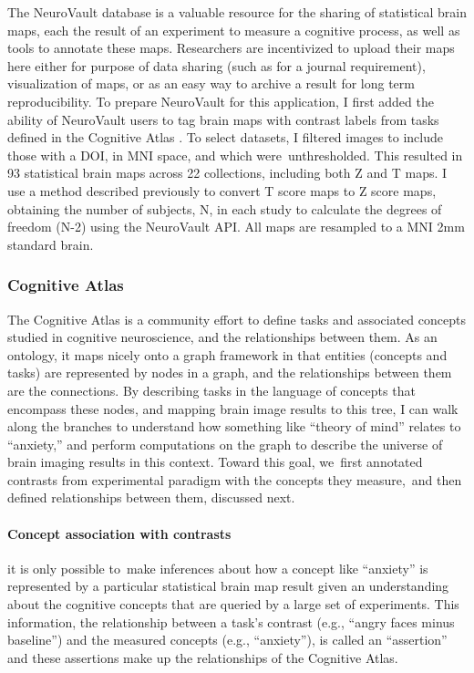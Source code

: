 \documentclass{report}
\begin{document}
The NeuroVault database is a valuable resource for the sharing of
statistical brain maps, each the result of an experiment to measure a
cognitive process, as well as tools to annotate these maps. Researchers
are incentivized to upload their maps here either for purpose of data
sharing (such as for a journal requirement), visualization of maps, or
as an easy way to archive a result for long term reproducibility. To
prepare NeuroVault for this application, I first added the ability of
NeuroVault users to tag brain maps with contrast labels from tasks
defined in the Cognitive Atlas
 \cite{NeuroVault_undated-gr}.
To select datasets, I filtered images to include those with a DOI, in
MNI space, and which were~unthresholded. This resulted in 93 statistical
brain maps across 22 collections, including both Z and T maps. I use a
method described previously \cite{Sochat2015-qs} to
convert T score maps to Z score maps, obtaining the number of subjects,
N, in each study to calculate the degrees of freedom (N-2) using the
NeuroVault API. All maps are resampled to a MNI 2mm standard brain.

\subsubsection{Cognitive Atlas}

The Cognitive Atlas is a community effort to define tasks and associated
concepts studied in cognitive neuroscience, and the relationships
between them. As an ontology, it maps nicely onto a graph framework in
that entities (concepts and tasks) are represented by nodes in a graph,
and the relationships between them are the connections. By describing
tasks in the language of concepts that encompass these nodes, and
mapping brain image results to this tree, I can walk along the branches
to understand how something like ``theory of mind'' relates to
``anxiety,'' and perform computations on the graph to describe the
universe of brain imaging results in this context. Toward this goal,
we~first annotated contrasts from experimental paradigm with the
concepts they measure,~and then defined relationships between them,
discussed next.

\paragraph{Concept association with contrasts}

it is only possible to~make inferences about how a concept like
``anxiety'' is represented by a particular statistical brain map result
given an understanding about the cognitive concepts that are queried by
a large set of experiments. This information, the relationship between a
task's contrast (e.g., ``angry faces minus baseline'') and the measured
concepts (e.g., ``anxiety''), is called an ``assertion'' and these
assertions make up the relationships of the Cognitive Atlas.
\end{document}

